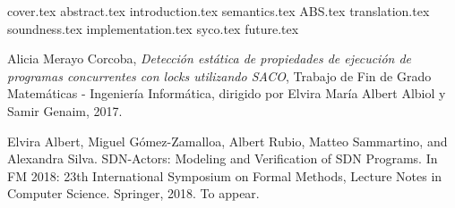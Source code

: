 \documentclass[spanish, a4paper, 12pt] {book}
\begin{document}
{cover.tex}
{abstract.tex}
\tableofcontents
{introduction.tex}
{semantics.tex}
{ABS.tex}
{translation.tex}
{soundness.tex}
{implementation.tex}
{syco.tex}
{future.tex}
\begin{thebibliography}{9}

  Alicia Merayo Corcoba,
  \textit{Detección estática de propiedades de ejecución de programas concurrentes con locks utilizando SACO},
  Trabajo de Fin de Grado Matemáticas - Ingeniería Informática,
  dirigido por Elvira María Albert Albiol y Samir Genaim,
  2017.

 Elvira Albert, Miguel Gómez-Zamalloa, Albert Rubio, Matteo Sammartino, and Alexandra Silva. SDN-Actors: Modeling and Verification of SDN Programs. In FM 2018: 23th International Symposium on Formal Methods, Lecture Notes in Computer Science. Springer, 2018. To appear.
\end{thebibliography}
\end{document}
